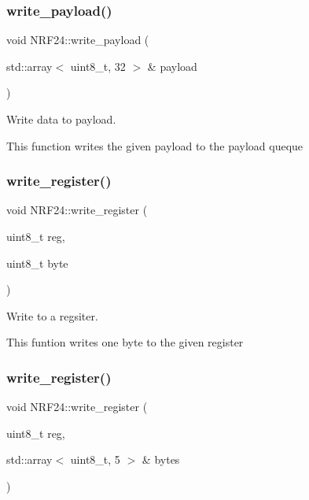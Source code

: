 \subsubsection{\texorpdfstring{write\+\_\+payload()}{write\_payload()}}
{\footnotesize\ttfamily void N\+R\+F24\+::write\+\_\+payload (\begin{DoxyParamCaption}\item[{std\+::array$<$ uint8\+\_\+t, 32 $>$ \&}]{payload }\end{DoxyParamCaption})\hspace{0.3cm}{\ttfamily [protected]}}



Write data to payload. 

This function writes the given payload to the payload queque \mbox{\label{classNRF24_abbcc96350aaa147dca8af1f7e93ea6ec}} 
\subsubsection{\texorpdfstring{write\+\_\+register()}{write\_register()}\hspace{0.1cm}{\footnotesize\ttfamily [1/2]}}
{\footnotesize\ttfamily void N\+R\+F24\+::write\+\_\+register (\begin{DoxyParamCaption}\item[{uint8\+\_\+t}]{reg,  }\item[{uint8\+\_\+t}]{byte }\end{DoxyParamCaption})\hspace{0.3cm}{\ttfamily [protected]}}



Write to a regsiter. 

This funtion writes one byte to the given register \mbox{\label{classNRF24_afca9ea1e390b23f5e220a0d0e823a4e3}} 
\subsubsection{\texorpdfstring{write\+\_\+register()}{write\_register()}\hspace{0.1cm}{\footnotesize\ttfamily [2/2]}}
{\footnotesize\ttfamily void N\+R\+F24\+::write\+\_\+register (\begin{DoxyParamCaption}\item[{uint8\+\_\+t}]{reg,  }\item[{std\+::array$<$ uint8\+\_\+t, 5 $>$ \&}]{bytes }\end{DoxyParamCaption})\hspace{0.3cm}{\ttfamily [protected]}}




